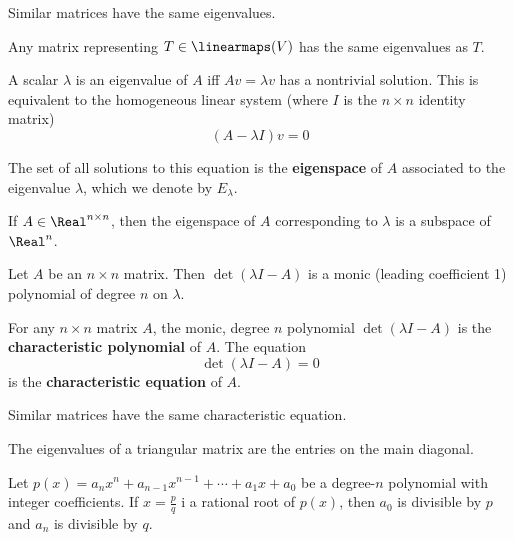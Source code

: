 \begin{lemma}
  Similar matrices have the same eigenvalues.

  Any matrix representing $T \in \linearmaps(V)$ has the same eigenvalues as $T$.
\end{lemma}

\begin{definition}[Eigenspace]
  A scalar $\lambda$ is an eigenvalue of $A$ iff $Av = \lambda v$ has a nontrivial solution. This is equivalent to the homogeneous linear system (where $I$ is the $n \times n$ identity matrix)
  \[
    (A - \lambda I) v = 0
  \]

  The set of all solutions to this equation is the \textbf{eigenspace} of $A$ associated to the eigenvalue $\lambda$, which we denote by $E_\lambda$.
\end{definition}

\begin{lemma}
  If $A \in \Real^{n \times n}$, then the eigenspace of $A$ corresponding to $\lambda$ is a subspace of $\Real^n$.
\end{lemma}

\begin{lemma}
  Let $A$ be an $n \times n$ matrix. Then $\det(\lambda I - A)$ is a monic (leading coefficient 1) polynomial of degree $n$ on $\lambda$.
\end{lemma}

\begin{definition}
  For any $n \times n$ matrix $A$, the monic, degree $n$ polynomial $\det(\lambda I - A)$ is the \textbf{characteristic polynomial} of $A$. The equation
  \[
    \det(\lambda I - A) = 0
  \]
  is the \textbf{characteristic equation} of $A$.
\end{definition}

\begin{lemma}
  Similar matrices have the same characteristic equation.
\end{lemma}

\begin{lemma}
  The eigenvalues of a triangular matrix are the entries on the main diagonal.
\end{lemma}

\begin{theorem}
  Let $p(x) = a_n x^n + a_{n-1} x^{n - 1} + \cdots + a_1 x + a_0$ be a degree-$n$ polynomial with integer coefficients. If $x = \frac{p}{q}$ i a rational root of $p(x)$, then $a_0$ is divisible by $p$ and $a_n$ is divisible by $q$.
\end{theorem}

